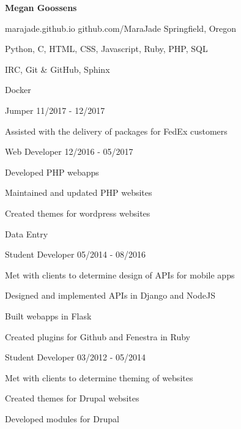 \documentclass[11pt]{article} %
\begin{document}
\centerline{{\Huge \bf Megan Goossens}}
\bigskip


        {marajade.github.io}
        {github.com/MaraJade}
        {Springfield, Oregon}



      {Python, C, HTML, CSS, Javascript, Ruby, PHP, SQL}

      {IRC, Git \& GitHub, Sphinx}

      {Docker}


\begin{description}

\squish
{}
           {Jumper}
           {11/2017 - 12/2017}

Assisted with the delivery of packages for FedEx customers


\squish
{}
           {Web Developer}
           {12/2016 - 05/2017}

Developed PHP webapps

Maintained and updated PHP websites

Created themes for wordpress websites

Data Entry


           {Student Developer}
           {05/2014 - 08/2016}

Met with clients to determine design of APIs for mobile apps

Designed and implemented APIs in Django and NodeJS

Built webapps in Flask

Created plugins for Github and Fenestra in Ruby


           {Student Developer}
           {03/2012 - 05/2014}

Met with clients to determine theming of websites

Created themes for Drupal websites

Developed modules for Drupal


\end{description}

\end{document}
